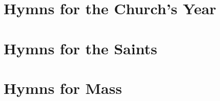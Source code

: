 \def\tabmark{Seasonal Hymns}

\chapter{Hymns for the Church's Year}









\newpage













\newpage


%


\def\tabmark{Saints' Hymns}
\chapter{Hymns for the Saints}




\newpage



\def\tabmark{General Hymns}
\chapter{Hymns for Mass}





%

\vfill

